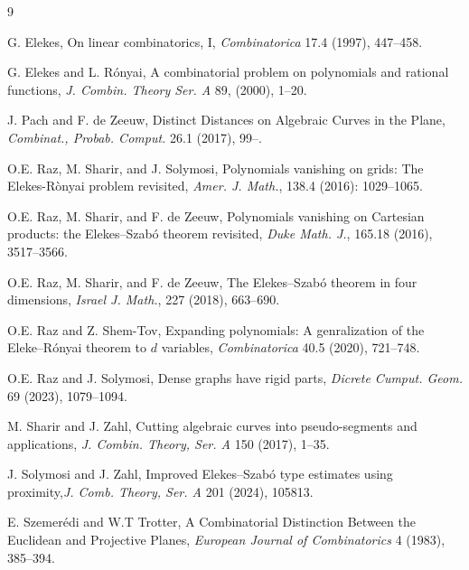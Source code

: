 \documentclass[letterpaper, reqno,11pt]{article}
\theoremstyle{definition}
\theoremstyle{remark}
\begin{document}
\begin{thebibliography}{9}

G. Elekes, 
On linear combinatorics, I, {\it Combinatorica} 17.4 (1997), 447--458.

G. Elekes and L. R\'onyai, A combinatorial problem on polynomials and rational functions, \emph{J. Combin. Theory Ser. A} 89, (2000), 1--20.

J. Pach and F. de Zeeuw,
Distinct Distances on Algebraic Curves in the Plane,
{\it Combinat., Probab. Comput.} 26.1 (2017), 99--.

O.\;E. Raz, M. Sharir, and J. Solymosi,
Polynomials vanishing on grids: The Elekes-R\`onyai problem revisited,
\emph{Amer. J. Math.}, 138.4 (2016): 1029--1065.


O.\;E. Raz, M. Sharir, and F. de Zeeuw, Polynomials vanishing on Cartesian products: the Elekes--Szab\'o theorem revisited, \emph{Duke Math. J.}, 165.18 (2016), 3517--3566.

O.\;E. Raz, M. Sharir, and F. de Zeeuw,  The Elekes--Szab\'o theorem in four dimensions, 
\emph{Israel J. Math.}, 227 (2018), 663--690.

O.\;E. Raz and Z. Shem-Tov, 
Expanding polynomials: A genralization of the Eleke--R\'onyai theorem to $d$ variables,
\emph{Combinatorica} 40.5 (2020), 721--748.

O.\;E. Raz and J. Solymosi,
Dense graphs have rigid parts,
\emph{Dicrete Cumput. Geom.} 69 (2023), 1079--1094.

M. Sharir and J. Zahl,
Cutting algebraic curves into pseudo-segments and applications,
\emph{J. Combin. Theory, Ser. A} 150 (2017), 1--35.


J. Solymosi and J. Zahl,
Improved Elekes--Szab\'o type estimates using proximity,\emph{J. Comb. Theory, Ser. A} 201 (2024), 105813.

 E. Szemer\'edi and W.\;T Trotter, A Combinatorial Distinction Between the Euclidean and Projective Planes,
 \emph{European Journal of Combinatorics} 4 (1983), 385--394.


\end{thebibliography}
\end{document}
